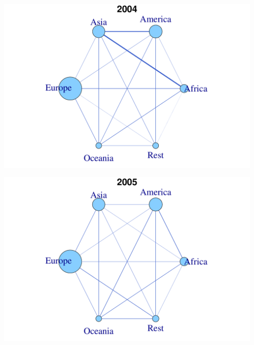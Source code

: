 \documentclass[a4paper,ngerman,oneside,titlepage,bibliography=totoc,11pt]{scrreprt}
\begin{document}
\begin{minipage}[t]{0.48\textwidth}
		\centering
			\includegraphics[width=1\textwidth]{Grafiken/Cont_Ani/cont13.pdf}
\end{minipage}	
\hfill	
\begin{minipage}[t]{0.48\textwidth}	
			\centering
			\includegraphics[width=1\textwidth]{Grafiken/Cont_Ani/cont14.pdf}
\end{minipage}
\end{document}
